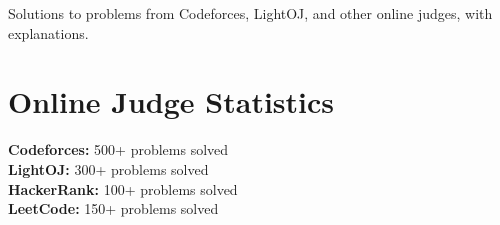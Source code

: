 \documentclass[a4paper,10pt]{article}
\begin{document}
\begin{projectbox}[title={\href{https://github.com/sudiptarathi2020/Problem-Solves.git}{Online Judge Problem Solutions}}]
Solutions to problems from Codeforces, LightOJ, and other online judges, with explanations.
\end{projectbox}

\section*{Online Judge Statistics}
\begin{multicols}{2}
\textbf{Codeforces:} 500+ problems solved \\
\textbf{LightOJ:} 300+ problems solved \\
\textbf{HackerRank:} 100+ problems solved \\
\textbf{LeetCode:} 150+ problems solved
\end{multicols}
\end{document}
